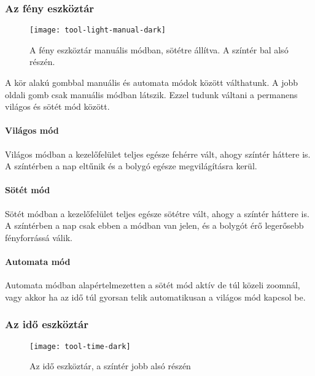\subsubsection{Az fény eszköztár}

\begin{figure}[h!]
	\centering
	\texttt{[image: tool-light-manual-dark]}
	\caption{A fény eszköztár manuális módban, sötétre állítva. A színtér bal alsó részén.}
	\label{fig:tool-light-manual-dark}
\end{figure}

A kör alakú gombbal manuális és automata módok között válthatunk. A jobb oldali gomb csak manuális módban látszik. Ezzel tudunk váltani a permanens világos és sötét mód között.

\paragraph{Világos mód}

Világos módban a kezelőfelület teljes egésze fehérre vált, ahogy színtér háttere is. A színtérben a nap eltűnik és a bolygó egésze megvilágításra kerül.

\paragraph{Sötét mód}

Sötét módban a kezelőfelület teljes egésze sötétre vált, ahogy a színtér háttere is. A színtérben a nap csak ebben a módban van jelen, és a bolygót érő legerősebb fényforrássá válik.

\paragraph{Automata mód}

Automata módban alapértelmezetten a sötét mód aktív de túl közeli zoomnál, vagy akkor ha az idő túl gyorsan telik automatikusan a világos mód kapcsol be.


\subsubsection{Az idő eszköztár}

\begin{figure}[h!]
	\centering
	\texttt{[image: tool-time-dark]}
	\caption{Az idő eszköztár, a színtér jobb alsó részén}
	\label{fig:tool-time-dark}
\end{figure}

